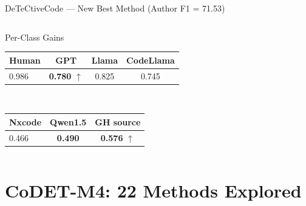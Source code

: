 \documentclass[aspectratio=169, 10pt]{beamer}
\begin{document}
\begin{frame}{DeTeCtiveCode --- New Best Method (Author F1 = 71.53)}
\begin{columns}[T]
\begin{block}{\scriptsize Per-Class Gains}
\scriptsize
\begin{tabular}{lccc}
\toprule
Human & GPT & Llama & CodeLlama \\
\midrule
0.986 & \textbf{0.780} $\uparrow$ & 0.825 & 0.745 \\
\bottomrule
\end{tabular}\\[2pt]
\begin{tabular}{lcc}
\toprule
\alert{Nxcode} & \alert{Qwen1.5} & GH source \\
\midrule
0.466 & \textbf{0.490} & \textbf{0.576} $\uparrow$ \\
\bottomrule
\end{tabular}
\end{block}
\end{columns}
\end{frame}


\section{CoDET-M4: 22 Methods Explored}
\end{document}
